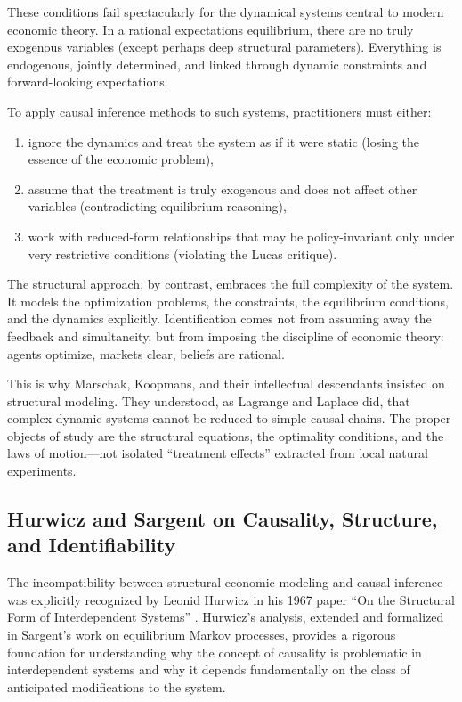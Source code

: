\documentclass[12pt]{article}
\begin{document}
These conditions fail spectacularly for the dynamical systems central to modern economic theory. In a rational expectations equilibrium, there are no truly exogenous variables (except perhaps deep structural parameters). Everything is endogenous, jointly determined, and linked through dynamic constraints and forward-looking expectations.

To apply causal inference methods to such systems, practitioners must either:
\begin{enumerate}
\item ignore the dynamics and treat the system as if it were static (losing the essence of the economic problem),
\item assume that the treatment is truly exogenous and does not affect other variables (contradicting equilibrium reasoning),
\item work with reduced-form relationships that may be policy-invariant only under very restrictive conditions (violating the Lucas critique).
\end{enumerate}

The structural approach, by contrast, embraces the full complexity of the system. It models the optimization problems, the constraints, the equilibrium conditions, and the dynamics explicitly. Identification comes not from assuming away the feedback and simultaneity, but from imposing the discipline of economic theory: agents optimize, markets clear, beliefs are rational.

This is why Marschak, Koopmans, and their intellectual descendants insisted on structural modeling. They understood, as Lagrange and Laplace did, that complex dynamic systems cannot be reduced to simple causal chains. The proper objects of study are the structural equations, the optimality conditions, and the laws of motion---not isolated ``treatment effects'' extracted from local natural experiments.


\subsection{Hurwicz and Sargent on Causality, Structure, and Identifiability}

The incompatibility between structural economic modeling and causal inference was explicitly recognized by Leonid Hurwicz in his 1967 paper ``On the Structural Form of Interdependent Systems'' \cite{Hurwicz1967}. Hurwicz's analysis, extended and formalized in Sargent's work on equilibrium Markov processes, provides a rigorous foundation for understanding why the concept of causality is problematic in interdependent systems and why it depends fundamentally on the class of anticipated modifications to the system.
\end{document}
